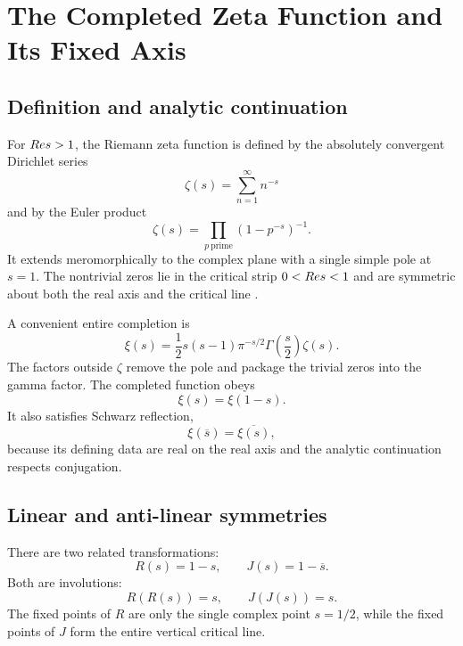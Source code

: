 \chapter{The Completed Zeta Function and Its Fixed Axis}
\label{ch:zeta}

\section{Definition and analytic continuation}
For $Re s>1$, the Riemann zeta function is defined by the absolutely convergent Dirichlet series
\begin{equation}
\zeta(s)=\sum_{n=1}^{\infty}n^{-s}
\end{equation}
and by the Euler product
\begin{equation}
\zeta(s)=\prod_{p\ \mathrm{prime}}\left(1-p^{-s}\right)^{-1}.
\end{equation}
It extends meromorphically to the complex plane with a single simple pole at $s=1$. The nontrivial zeros lie in the critical strip $0<Re s<1$ and are symmetric about both the real axis and the critical line \cite{Riemann1859,Titchmarsh1986,DLMF25}.

A convenient entire completion is
\begin{equation}
\xi(s)=\frac12 s(s-1)\pi^{-s/2}\Gamma\!\left(\frac{s}{2}\right)\zeta(s).
\label{eq:xi-def}
\end{equation}
The factors outside $\zeta$ remove the pole and package the trivial zeros into the gamma factor. The completed function obeys
\begin{equation}
\xi(s)=\xi(1-s).
\label{eq:xi-fe}
\end{equation}
It also satisfies Schwarz reflection,
\begin{equation}
\xi(\overline{s})=\overline{\xi(s)},
\label{eq:xi-conj}
\end{equation}
because its defining data are real on the real axis and the analytic continuation respects conjugation.

\section{Linear and anti-linear symmetries}
There are two related transformations:
\begin{equation}
R(s)=1-s,
\qquad
J(s)=1-\overline{s}.
\end{equation}
Both are involutions:
\begin{equation}
R(R(s))=s,
\qquad
J(J(s))=s.
\end{equation}
The fixed points of $R$ are only the single complex point $s=1/2$, while the fixed points of $J$ form the entire vertical critical line.


